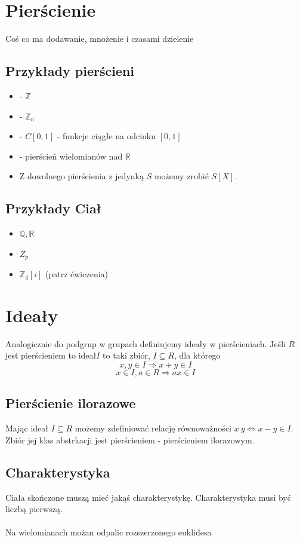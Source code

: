 \section{Pierścienie}
Coś co ma dodawanie, mnożenie i czasami dzielenie 
\subsection{Przykłady pierścieni}
\begin{itemize}
  \item - $\mathbb{Z}$
  \item - $\mathbb{Z}_n$
  \item - $C[0,1]$ - funkcje ciągłe na odcinku $[0,1]$ 
  \item - pierścień wielomianów nad $\mathbb{R}$
  \item Z dowolnego pierścienia z jedynką $S$ możemy zrobić $S[X]$.
\end{itemize}
\subsection{Przykłady Ciał}
\begin{itemize}
  \item $\mathbb{Q}, \mathbb{R}$ 
  \item $Z_p$
  \item $\mathbb{Z}_3 [i]$ (patrz ćwiczenia)

\end{itemize}
\section{Ideały}
Analogicznie do podgrup w grupach definiujemy ideały w pierścieniach. Jeśli $R$ jest pierścieniem to ideał$I$ to taki zbiór, $I\subseteq R$, dla którego
$$x,y \in I \Rightarrow x+y \in I$$ 
$$x \in I, a\in R \Rightarrow ax \in I$$
\subsection{Pierścienie ilorazowe}
Mając ideał $I \subseteq R$ możemy zdefiniować relację równoważności $x ~ y \Leftrightarrow x-y \in I$. Zbiór jej klas abstrkacji jest pierścieniem - pierścieniem ilorazowym.
\subsection{Charakterystyka}
Ciała skończone muszą mieć jakąś charakterystykę. Charakterystyka musi być liczbą pierwszą.
\\\\Na wielomianach możan odpalic rozszerzonego euklidesa
